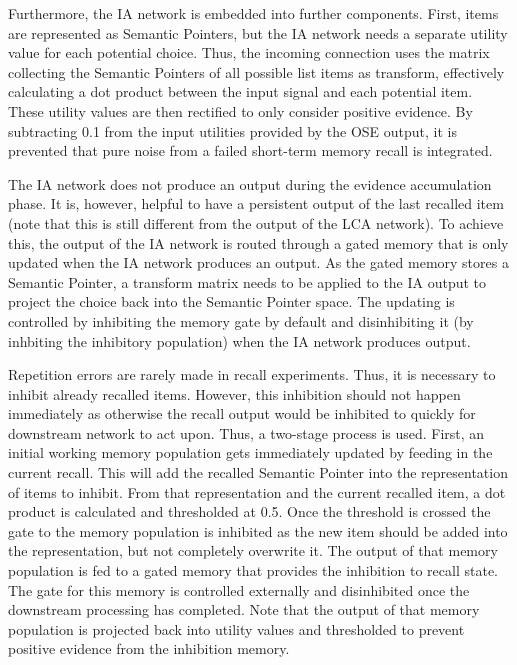 Furthermore, the IA network is embedded into further components.
First, items are represented as Semantic Pointers, but the IA network needs a separate utility value for each potential choice.
Thus, the incoming connection uses the matrix collecting the Semantic Pointers of all possible list items as transform, effectively calculating a dot product between the input signal and each potential item.
These utility values are then rectified to only consider positive evidence.
By subtracting \num{0.1} from the input utilities provided by the OSE output, it is prevented that pure noise from a failed short-term memory recall is integrated.

The IA network does not produce an output during the evidence accumulation phase.
It is, however, helpful to have a persistent output of the last recalled item (note that this is still different from the output of the LCA network).
To achieve this, the output of the IA network is routed through a gated memory that is only updated when the IA network produces an output.
As the gated memory stores a Semantic Pointer, a transform matrix needs to be applied to the IA output to project the choice back into the Semantic Pointer space.
The updating is controlled by inhibiting the memory gate by default and disinhibiting it (by inhbiting the inhibitory population) when the IA network produces output.

Repetition errors are rarely made in recall experiments.
Thus, it is necessary to inhibit already recalled items.
However, this inhibition should not happen immediately as otherwise the recall output would be inhibited to quickly for downstream network to act upon.
Thus, a two-stage process is used.
First, an initial working memory population gets immediately updated by feeding in the current recall.
This will add the recalled Semantic Pointer into the representation of items to inhibit.
From that representation and the current recalled item, a dot product is calculated and thresholded at \num{0.5}.
Once the threshold is crossed the gate to the memory population is inhibited as the new item should be added into the representation, but not completely overwrite it.
The output of that memory population is fed to a gated memory that provides the inhibition to recall state.
The gate for this memory is controlled externally and disinhibited once the downstream processing has completed.
Note that the output of that memory population is projected back into utility values and thresholded to prevent positive evidence from the inhibition memory.

